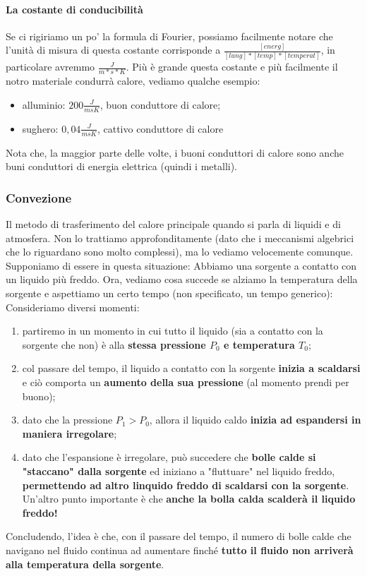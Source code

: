             \paragraph{La costante di conducibilità}
                Se ci rigiriamo un po' la formula di Fourier, possiamo facilmente notare che l'unità di misura di questa costante corrisponde a $\frac{[energ]}{[lung]*[temp]*[temperat]}$, in particolare avremmo $\frac{J}{m*s*K}$. Più è grande questa costante e più facilmente il notro materiale condurrà calore, vediamo qualche esempio:
                \begin{itemize}
                    \item alluminio: $200\frac{J}{msK}$, buon conduttore di calore;
                    \item sughero: $0,04\frac{J}{msK}$, cattivo conduttore di calore
                \end{itemize}
                Nota che, la maggior parte delle volte, i buoni conduttori di calore sono anche buni conduttori di energia elettrica (quindi i metalli).


        \subsubsection{Convezione}
            Il metodo di trasferimento del calore principale quando si parla di liquidi e di atmosfera. Non lo trattiamo approfonditamente (dato che i meccanismi algebrici che lo riguardano sono molto complessi), ma lo vediamo velocemente comunque. Supponiamo di essere in questa situazione:
            Abbiamo una sorgente a contatto con un liquido più freddo. Ora, vediamo cosa succede se alziamo la temperatura della sorgente e aspettiamo un certo tempo (non specificato, un tempo generico):
            Consideriamo diversi momenti:
            \begin{enumerate}
                \item partiremo in un momento in cui tutto il liquido (sia a contatto con la sorgente che non) è alla \textbf{stessa pressione $P_0$ e temperatura $T_0$};
                \item col passare del tempo, il liquido a contatto con la sorgente \textbf{inizia a scaldarsi} e ciò comporta un \textbf{aumento della sua pressione} (al momento prendi per buono);
                \item dato che la pressione $P_1 > P_0$, allora il liquido caldo \textbf{inizia ad espandersi in maniera irregolare};
                \item dato che l'espansione è irregolare, può succedere che \textbf{bolle calde si "staccano" dalla sorgente} ed iniziano a "fluttuare" nel liquido freddo, \textbf{permettendo ad altro linquido freddo di scaldarsi con la sorgente}. Un'altro punto importante è che \textbf{anche la bolla calda scalderà il liquido freddo!}
            \end{enumerate}
            Concludendo, l'idea è che, con il passare del tempo, il numero di bolle calde che navigano nel fluido continua ad aumentare finché \textbf{tutto il fluido non arriverà alla temperatura della sorgente}.

